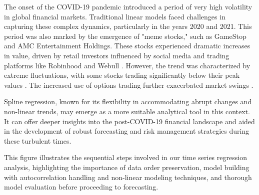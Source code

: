 \documentclass[12pt, twoside,hidelinks]{article}
\theoremstyle{definition}
\numberwithin{equation}{section}
\begin{document}
The onset of the COVID-19 pandemic introduced a period of very high volatility in global financial markets. Traditional linear models faced challenges in capturing these complex dynamics, particularly in the years 2020 and 2021. This period was also marked by the emergence of "meme stocks," such as GameStop and AMC Entertainment Holdings. These stocks experienced dramatic increases in value, driven by retail investors influenced by social media and trading platforms like Robinhood and Webull \cite{reuters2021meme}. However, the trend was characterized by extreme fluctuations, with some stocks trading significantly below their peak values \cite{reuters2021meme2}. The increased use of options trading further exacerbated market swings \cite{reuters2021options}.
\newline
    
Spline regression, known for its flexibility in accommodating abrupt changes and non-linear trends, may emerge as a more suitable analytical tool in this context. It can offer deeper insights into the post-COVID-19 financial landscape and aided in the development of robust forecasting and risk management strategies during these turbulent times.
\newline

\begin{center}
\end{center}

This figure illustrates the sequential steps involved in our time series regression analysis, highlighting the importance of data order preservation, model building with autocorrelation handling and non-linear modeling techniques, and thorough model evaluation before proceeding to forecasting.
\end{document}
